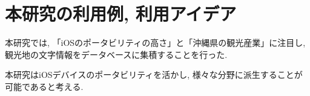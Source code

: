 \chapter{本研究の利用例, 利用アイデア}
\label{chap:utilization}

本研究では, 「iOSのポータビリティの高さ」と「沖縄県の観光産業」に注目し, 観光地の文字情報をデータベースに集積することを行った.

本研究はiOSデバイスのポータビリティを活かし, 様々な分野に派生することが可能であると考える.
